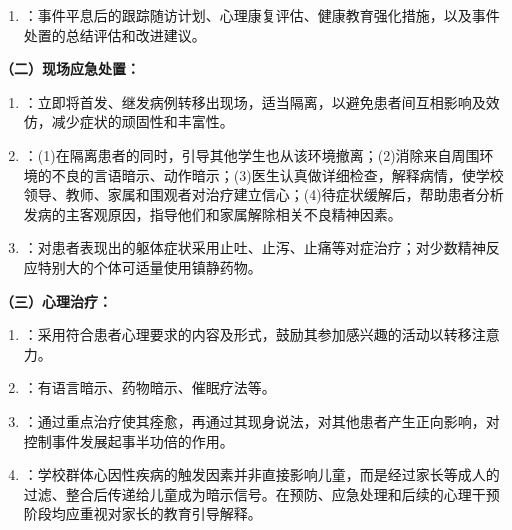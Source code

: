 \begin{keybox}
\begin{keybox}
\begin{enumerate}[leftmargin=*]
    \item {}：事件平息后的跟踪随访计划、心理康复评估、健康教育强化措施，以及事件处置的总结评估和改进建议。
\end{enumerate}
\end{keybox}

\textbf{（二）现场应急处置：}
\begin{enumerate}[leftmargin=*]
    \item {}：立即将首发、继发病例转移出现场，适当隔离，以避免患者间互相影响及效仿，减少症状的顽固性和丰富性。
    \item {}：(1)在隔离患者的同时，引导其他学生也从该环境撤离；(2)消除来自周围环境的不良的言语暗示、动作暗示；(3)医生认真做详细检查，解释病情，使学校领导、教师、家属和围观者对治疗建立信心；(4)待症状缓解后，帮助患者分析发病的主客观原因，指导他们和家属解除相关不良精神因素。
    \item {}：对患者表现出的躯体症状采用止吐、止泻、止痛等对症治疗；对少数精神反应特别大的个体可适量使用镇静药物。
\end{enumerate}

\textbf{（三）心理治疗：}
\begin{enumerate}[leftmargin=*]
    \item {}：采用符合患者心理要求的内容及形式，鼓励其参加感兴趣的活动以转移注意力。
    \item {}：有语言暗示、药物暗示、催眠疗法等。
    \item {}：通过重点治疗使其痊愈，再通过其现身说法，对其他患者产生正向影响，对控制事件发展起事半功倍的作用。
    \item {}：学校群体心因性疾病的触发因素并非直接影响儿童，而是经过家长等成人的过滤、整合后传递给儿童成为暗示信号。在预防、应急处理和后续的心理干预阶段均应重视对家长的教育引导解释。
\end{enumerate}
\end{keybox}

\newpage

